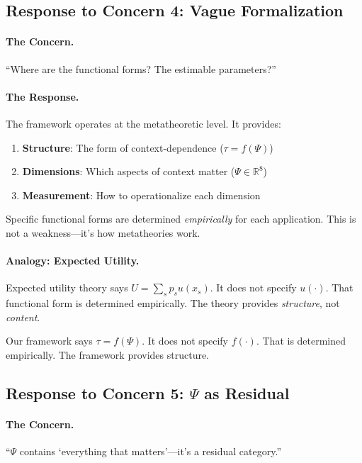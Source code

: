 \subsection{Response to Concern 4: Vague Formalization}

\paragraph{The Concern.}
``Where are the functional forms? The estimable parameters?''

\paragraph{The Response.}
The framework operates at the metatheoretic level. It provides:
\begin{enumerate}
    \item \textbf{Structure}: The form of context-dependence ($\tau = f(\Psi)$)
    \item \textbf{Dimensions}: Which aspects of context matter ($\Psi \in \mathbb{R}^8$)
    \item \textbf{Measurement}: How to operationalize each dimension
\end{enumerate}

Specific functional forms are determined \textit{empirically} for each application. This is not a weakness---it's how metatheories work.

\paragraph{Analogy: Expected Utility.}
Expected utility theory says $U = \sum_s p_s u(x_s)$. It does not specify $u(\cdot)$. That functional form is determined empirically. The theory provides \textit{structure}, not \textit{content}.

Our framework says $\tau = f(\Psi)$. It does not specify $f(\cdot)$. That is determined empirically. The framework provides structure.

\subsection{Response to Concern 5: $\Psi$ as Residual}

\paragraph{The Concern.}
``$\Psi$ contains `everything that matters'---it's a residual category.''

